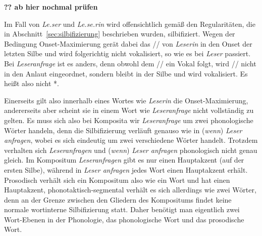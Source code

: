 \begin{exe}
  \ex\label{ex:phol8945}
  \begin{xlist}
  \end{xlist}
\end{exe}

\textbf{?? ab hier nochmal prüfen}

Im Fall von \textit{Le.ser} und \textit{Le.se.rin} wird offensichtlich gemäß den Regularitäten, die in Abschnitt~\ref{sec:silbifizierung} beschrieben wurden, silbifiziert.
Wegen der Bedingung Onset-Maximierung gerät dabei das // von \textit{Leserin} in den Onset der letzten Silbe und wird folgerichtig nicht vokalisiert, so wie es bei \textit{Leser} passiert.
Bei \textit{Leseranfrage} ist es anders, denn obwohl dem // ein Vokal folgt, wird // nicht in den Anlaut eingeordnet, sondern bleibt in der Silbe \textipa{[z5]} und wird vokalisiert.
Es heißt also nicht *.

Einerseits gilt also innerhalb eines Wortes wie \textit{Leserin} die Onset-Maximierung, andererseits aber scheint sie in einem Wort wie \textit{Leseranfrage} nicht vollständig zu gelten.
Es muss sich also bei Komposita wir \textit{Leseranfrage} um zwei phonologische Wörter handeln, denn die Silbifizierung verläuft genauso wie in (\textit{wenn}) \textit{Leser anfragen}, wobei es sich eindeutig um zwei verschiedene Wörter handelt.
Trotzdem verhalten sich \textit{Leseranfragen} und (\textit{wenn}) \textit{Leser anfragen} phonologisch nicht genau gleich.
Im Kompositum \textit{Leseranfragen} gibt es nur einen Hauptakzent (auf der ersten Silbe), während in \textit{Leser anfragen} jedes Wort einen Hauptakzent erhält.
Prosodisch verhält sich ein Kompositum also wie ein Wort und hat einen Hauptakzent, phonotaktisch-segmental verhält es sich allerdings wie zwei Wörter, denn an der Grenze zwischen den Gliedern des Kompositums findet keine normale wortinterne Silbifizierung statt.
Daher benötigt man eigentlich zwei Wort-Ebenen in der Phonologie, das phonologische Wort und das prosodische Wort.


